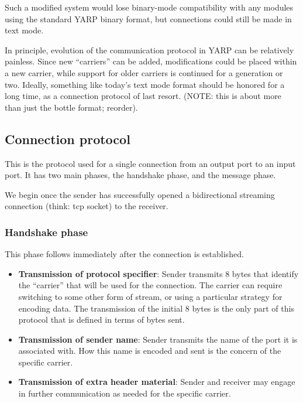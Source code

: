 Such a modified system would lose binary-mode compatibility with any
modules using the standard YARP binary format, but connections could
still be made in text mode.

In principle, evolution of the communication protocol in YARP can be
relatively painless.  Since new ``carriers'' can be added,
modifications could be placed within a new carrier, while support for
older carriers is continued for a generation or two.  Ideally,
something like today's text mode format should be honored for a long
time, as a connection protocol of last resort.
(NOTE: this is about more than just the bottle format; reorder).


\subsection{Connection protocol}

This is the protocol used for a single connection from an output port
to an input port. It has two main phases, the handshake phase,
and the message phase.

We begin once the sender has successfully opened a bidirectional
streaming connection (think: tcp socket) to the receiver.


\subsubsection{Handshake phase}

This phase follows immediately after the connection is established.

\begin{itemize}

\item {\bf Transmission of protocol specifier}:
Sender transmits 8 bytes that identify the ``carrier'' that will be
used for the connection.  The carrier can require switching to 
some other form of stream, or using a particular strategy for
encoding data.  The transmission of the initial 8 bytes is the
only part of this protocol that is defined in terms of bytes sent.

\item {\bf Transmission of sender name}: Sender transmits the name of
the port it is associated with.  How this name is encoded and sent is
the concern of the specific carrier.

\item {\bf Transmission of extra header material}: Sender and
receiver may engage in further communication as needed for the
specific carrier.  

\end{itemize}

